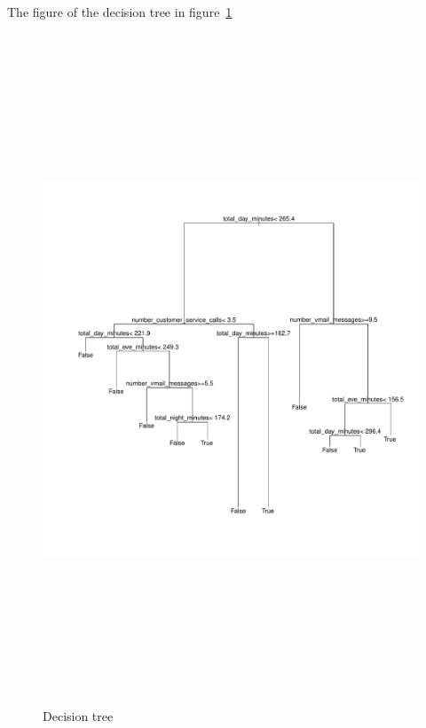 	The figure of the decision tree in figure~\ref{dt-fig}
		\begin{figure}
			\caption{Decision tree}
			\label{dt-fig}
			\hspace*{-1cm}
			\includegraphics[width=18cm,height=20cm]{progress_presentaion/ppt_figures/churnDecisionTree}
		\end{figure}

\newpage
